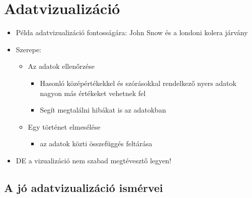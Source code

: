 \documentclass[
  letterpaper,
  DIV=11,
  numbers=noendperiod]{scrreprt}
\providecommand{\tightlist}{%
  \setlength{\itemsep}{0pt}\setlength{\parskip}{0pt}}\usepackage{longtable,booktabs,array}
\begin{document}

\hypertarget{adatvizualizuxe1ciuxf3}{%
\chapter{Adatvizualizáció}\label{adatvizualizuxe1ciuxf3}}

\begin{itemize}
\item
  Példa adatvizualizáció fontosságára: John Snow és a londoni kolera
  járvány
\item
  Szerepe:

  \begin{itemize}
  \item
    Az adatok ellenőrzése

    \begin{itemize}
    \item
      Hasonló középértékekkel és szórásokkal rendelkező nyers adatok
      nagyon más értékeket vehetnek fel
    \item
      Segít megtalálni hibákat is az adatokban
    \end{itemize}
  \item
    Egy történet elmesélése

    \begin{itemize}
    \tightlist
    \item
      az adatok közti összefüggés feltárása
    \end{itemize}
  \end{itemize}
\item
  DE a vizualizáció nem szabad megtévesztő legyen!
\end{itemize}

\hypertarget{a-juxf3-adatvizualizuxe1ciuxf3-ismuxe9rvei}{%
\section{A jó adatvizualizáció
ismérvei}\label{a-juxf3-adatvizualizuxe1ciuxf3-ismuxe9rvei}}
\end{document}
